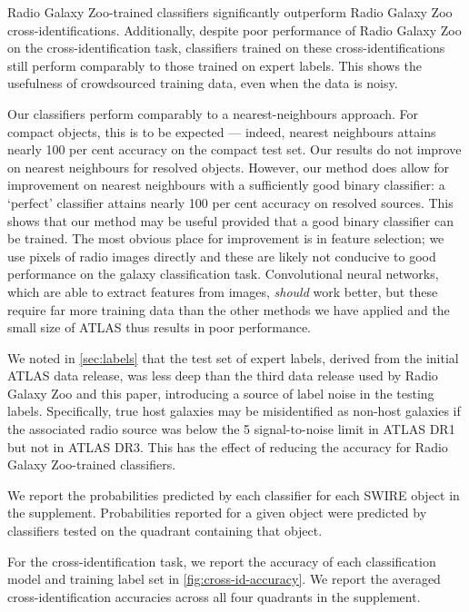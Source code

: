 \documentclass[fleqn,usenatbib,usedcolumn]{mnras}
\begin{document}
    Radio Galaxy Zoo-trained classifiers significantly outperform Radio Galaxy Zoo cross-identifications. Additionally, despite poor performance of Radio Galaxy Zoo on the cross-identification task, classifiers trained on these cross-identifications still perform comparably to those trained on expert labels. This shows the usefulness of crowdsourced training data, even when the data is noisy.

    Our classifiers perform comparably to a nearest-neighbours approach. For compact objects, this is to be expected --- indeed, nearest neighbours attains nearly 100 per cent accuracy on the compact test set. Our results do not improve on nearest neighbours for resolved objects. However, our method does allow for improvement on nearest neighbours with a sufficiently good binary classifier: a `perfect' classifier attains nearly 100 per cent accuracy on resolved sources. This shows that our method may be useful provided that a good binary classifier can be trained. The most obvious place for improvement is in feature selection; we use pixels of radio images directly and these are likely not conducive to good performance on the galaxy classification task. Convolutional neural networks, which are able to extract features from images, \emph{should} work better, but these require far more training data than the other methods we have applied and the small size of ATLAS thus results in poor performance.

    We noted in \autoref{sec:labels} that the test set of expert labels, derived from the initial ATLAS data release, was less deep than the third data release used by Radio Galaxy Zoo and this paper, introducing a source of label noise in the testing labels. Specifically, true host galaxies may be misidentified as non-host galaxies if the associated radio source was below the 5 signal-to-noise limit in ATLAS DR1 but not in ATLAS DR3. This has the effect of reducing the accuracy for Radio Galaxy Zoo-trained classifiers.

    We report the probabilities predicted by each classifier for each SWIRE
    object in the supplement. Probabilities reported for a given object
    were predicted by classifiers tested on the quadrant containing that
    object.

    For the cross-identification task, we report the accuracy of each
    classification model and training label set in
    \autoref{fig:cross-id-accuracy}. We report the averaged
    cross-identification accuracies across all four quadrants in the supplement.
\end{document}
